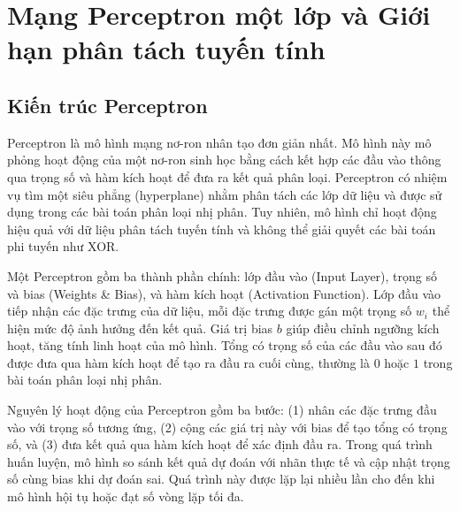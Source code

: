 \documentclass[12pt,a4paper]{report}
\begin{document}
\section{Mạng Perceptron một lớp và Giới hạn phân tách tuyến tính}
\subsection{Kiến trúc Perceptron}
Perceptron là mô hình mạng nơ-ron nhân tạo đơn giản nhất. Mô hình này mô phỏng hoạt động của một nơ-ron sinh học bằng cách kết hợp các đầu vào thông qua trọng số và hàm kích hoạt để đưa ra kết quả phân loại. Perceptron có nhiệm vụ tìm một siêu phẳng (hyperplane) nhằm phân tách các lớp dữ liệu và được sử dụng trong các bài toán phân loại nhị phân. Tuy nhiên, mô hình chỉ hoạt động hiệu quả với dữ liệu phân tách tuyến tính và không thể giải quyết các bài toán phi tuyến như XOR.

Một Perceptron gồm ba thành phần chính: lớp đầu vào (Input Layer), trọng số và bias (Weights \& Bias), và hàm kích hoạt (Activation Function). Lớp đầu vào tiếp nhận các đặc trưng của dữ liệu, mỗi đặc trưng được gán một trọng số $w_i$ thể hiện mức độ ảnh hưởng đến kết quả. Giá trị bias $b$ giúp điều chỉnh ngưỡng kích hoạt, tăng tính linh hoạt của mô hình. Tổng có trọng số của các đầu vào sau đó được đưa qua hàm kích hoạt để tạo ra đầu ra cuối cùng, thường là $0$ hoặc $1$ trong bài toán phân loại nhị phân. 

Nguyên lý hoạt động của Perceptron gồm ba bước: (1) nhân các đặc trưng đầu vào với trọng số tương ứng, (2) cộng các giá trị này với bias để tạo tổng có trọng số, và (3) đưa kết quả qua hàm kích hoạt để xác định đầu ra. Trong quá trình huấn luyện, mô hình so sánh kết quả dự đoán với nhãn thực tế và cập nhật trọng số cùng bias khi dự đoán sai. Quá trình này được lặp lại nhiều lần cho đến khi mô hình hội tụ hoặc đạt số vòng lặp tối đa.
\end{document}

